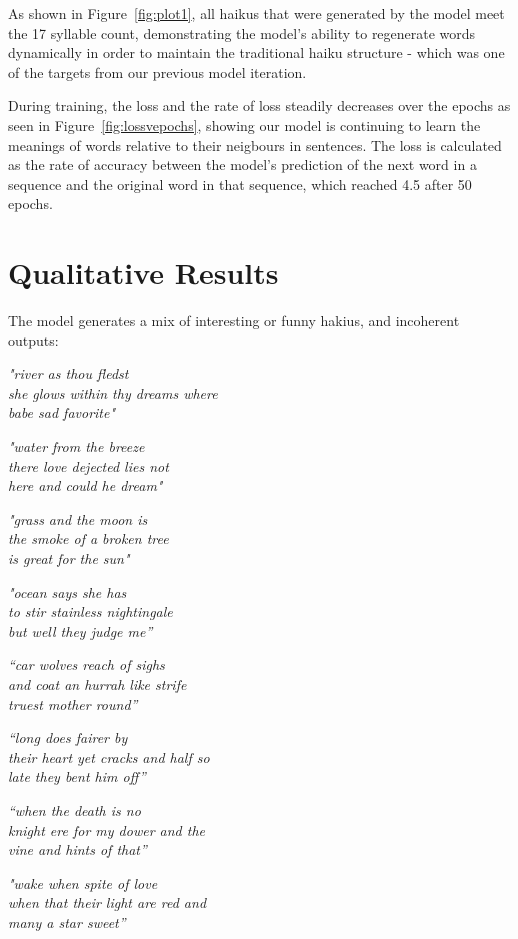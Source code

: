 \documentclass{article} %
\begin{document}
As shown in Figure~\ref{fig:plot1}, all haikus that were generated by the model meet the 17 syllable count, 
demonstrating the model’s ability to regenerate words dynamically in order to maintain the traditional haiku structure - which was one of the targets from our previous model iteration.

During training, the loss and the rate of loss steadily decreases over the epochs as seen in Figure~\ref{fig:lossvepochs}, showing our model is continuing to learn the meanings of words relative to their neigbours in sentences. 
The loss is calculated as the rate of accuracy between the model's prediction of the next word in a sequence and the original word in that sequence, which reached 4.5 after 50 epochs.

\section{Qualitative Results}
The model generates a mix of interesting or funny hakius, and incoherent outputs:

\break

\begin{multicols}{2}


  \textit{"river as thou fledst \\
  she glows within thy dreams where \\
  babe sad favorite"}

  \textit{"water from the breeze \\
  there love dejected lies not \\
  here and could he dream"}

  \textit{"grass and the moon is \\
  the smoke of a broken tree \\
  is great for the sun"}

  \textit{"ocean says she has \\
  to stir stainless nightingale \\
  but well they judge me”}


  \columnbreak

  \textit{“car wolves reach of sighs \\
  and coat an hurrah like strife \\
  truest mother round”}

  \textit{“long does fairer by \\
  their heart yet cracks and half so \\
  late they bent him off”}

  \textit{“when the death is no \\
  knight ere for my dower and the \\
  vine and hints of that”}

  \textit{"wake when spite of love \\
  when that their light are red and \\
  many a star sweet”}


\end{multicols}
\end{document}
